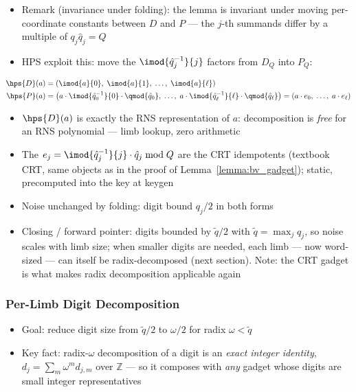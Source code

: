 {    \begin{itemize}
        \item Remark (invariance under folding): the lemma is invariant under moving
              per-coordinate constants between $D$ and $P$ --- the $j$-th summands differ
              by a multiple of $q_j \hat{q}_j = Q$
        \item HPS \cite{cryptoeprint:2018/117} exploit this: move the
              $\imod{\hat{q}_j^{-1}}{j}$ factors from $D_Q$ into $P_Q$:
    \end{itemize}
    \begin{align}
        \hps{D}(a) &= \left( \imod{a}{0},\; \imod{a}{1},\; \dots,\; \imod{a}{\ell}\right)\\
        \hps{P}(a) &= \left( a\cdot\imod{\hat{q}_0^{-1}}{0}\cdot\qmod{\hat{q}_0},\;
                       \dots,\; a\cdot\imod{\hat{q}_\ell^{-1}}{\ell}\cdot\qmod{\hat{q}_\ell} \right)
                    = \left(a\cdot e_0,\; \dots,\; a\cdot e_\ell\right)
    \end{align}
    \begin{itemize}
        \item $\hps{D}(a)$ is exactly the RNS representation of $a$: decomposition is
              \emph{free} for an RNS polynomial --- limb lookup, zero arithmetic
        \item The $e_j = \imod{\hat{q}_j^{-1}}{j}\cdot\hat{q}_j \bmod Q$ are the CRT
              idempotents (textbook CRT, same objects as in the proof of
              Lemma~\ref{lemma:bv_gadget}); static, precomputed into the key at keygen
        \item Noise unchanged by folding: digit bound $q_j/2$ in both forms
        \item Closing / forward pointer: digits bounded by $\tilde{q}/2$ with
              $\tilde{q} = \max_j q_j$, so noise scales with limb size;
              when smaller digits are needed, each limb --- now word-sized --- can itself
              be radix-decomposed (next section). Note: the CRT gadget is what makes
              radix decomposition applicable again
    \end{itemize}
    
    \subsubsection{Per-Limb Digit Decomposition}
    \begin{itemize}
        \item Goal: reduce digit size from $\tilde{q}/2$ to $\omega/2$ for radix $\omega < \tilde{q}$
        \item Key fact: radix-$\omega$ decomposition of a digit is an \emph{exact integer
              identity}, $d_j = \sum_m \omega^m d_{j,m}$ over $\mathbb{Z}$ --- so it
              composes with \emph{any} gadget whose digits are small integer representatives
    \end{itemize}
    
}
